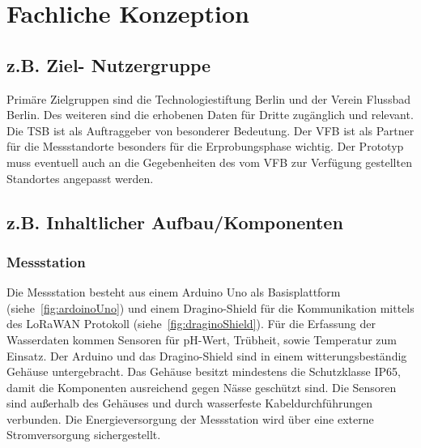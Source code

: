 \section{Fachliche Konzeption}

\subsection{z.B. Ziel- Nutzergruppe}

Primäre Zielgruppen sind die Technologiestiftung Berlin und der Verein Flussbad Berlin. Des weiteren sind die erhobenen Daten für Dritte zugänglich und relevant. Die TSB ist als Auftraggeber von besonderer Bedeutung. Der VFB ist als Partner für die Messstandorte besonders für die Erprobungsphase wichtig. Der Prototyp muss eventuell auch an die Gegebenheiten des vom VFB zur Verfügung gestellten Standortes angepasst werden.

\subsection{z.B. Inhaltlicher Aufbau/Komponenten}\label{subsec:con_strct_comp}

\subsubsection{Messstation}
Die Messstation besteht aus einem Arduino Uno als Basisplattform (siehe~\autoref{fig:ardoinoUno}) und einem Dragino-Shield für die Kommunikation mittels des LoRaWAN Protokoll (siehe~\autoref{fig:draginoShield}). Für die Erfassung der Wasserdaten kommen Sensoren für pH-Wert, Trübheit, sowie Temperatur zum Einsatz.\newline
Der Arduino und das Dragino-Shield sind in einem witterungsbest\"andig Gehäuse untergebracht. Das Gehäuse besitzt mindestens die Schutzklasse IP65, damit die Komponenten ausreichend gegen Nässe geschützt sind. Die Sensoren sind außerhalb des Gehäuses und durch wasserfeste Kabeldurchführungen verbunden. Die Energieversorgung der Messstation wird über eine externe Stromversorgung sichergestellt.

